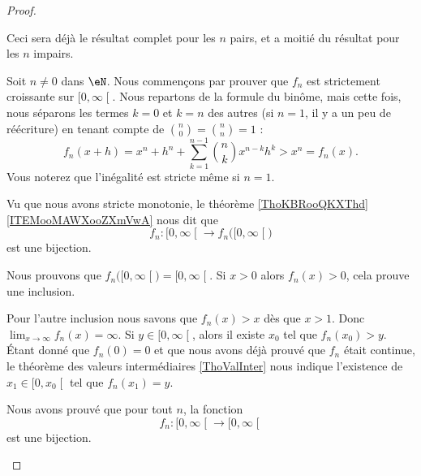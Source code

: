 \begin{proof}
\begin{subproof}
        \item[Pour \( n\) pair ou impair, bijection sur les positifs]
            Ceci sera déjà le résultat complet pour les \( n\) pairs, et a moitié du résultat pour les \( n\) impairs.
            \begin{subproof}
                \item[Stricte croissance]
                    Soit \( n\neq 0\) dans \( \eN\). Nous commençons par prouver que \( f_n\) est strictement croissante sur \( \mathopen[ 0 , \infty \mathclose[\). Nous repartons de la formule du binôme, mais cette fois, nous séparons les termes \( k=0\) et \( k=n\) des autres (si \( n=1\), il y a un peu de réécriture) en tenant compte de \( {n\choose 0}={n\choose n}=1\) :
                        \begin{equation}
                            f_n(x+h)=x^n+h^n+\sum_{k=1}^{n-1}{n\choose k}x^{n-k}h^k>x^n=f_n(x).
                        \end{equation}
                        Vous noterez que l'inégalité est stricte même si \( n=1\).

                        Vu que nous avons stricte monotonie, le théorème \ref{ThoKBRooQKXThd}\ref{ITEMooMAWXooZXmVwA} nous dit que
                        \begin{equation}
                            f_n\colon \mathopen[ 0 , \infty \mathclose[\to f_n\big( \mathopen[ 0 , \infty \mathclose[ \big)
                        \end{equation}
                        est une bijection.
                    \item[Bijection]
    
                        Nous prouvons que \( f_n\big( \mathopen[ 0 , \infty \mathclose[ \big)=\mathopen[ 0 , \infty \mathclose[\). Si \( x>0\) alors \( f_n(x)>0\), cela prouve une inclusion.

                            Pour l'autre inclusion nous savons que \( f_n(x)>x\) dès que \( x>1\). Donc \( \lim_{x\to \infty} f_n(x)=\infty\). Si \( y\in \mathopen[ 0 , \infty \mathclose[\), alors il existe \( x_0\) tel que \( f_n(x_0)>y\). Étant donné que \( f_n(0)=0\) et que nous avons déjà prouvé que \( f_n\) était continue, le théorème des valeurs intermédiaires \ref{ThoValInter} nous indique l'existence de \( x_1\in \mathopen[ 0 , x_0 \mathclose[\) tel que \( f_n(x_1)=y\).

            \end{subproof}

            Nous avons prouvé que pour tout \( n\), la fonction
            \begin{equation}        \label{EQooYWHGooJWMTUI}
                f_n\colon \mathopen[ 0 , \infty \mathclose[\to \mathopen[ 0 , \infty \mathclose[
            \end{equation}
            est une bijection.


\end{subproof}
\end{proof}
